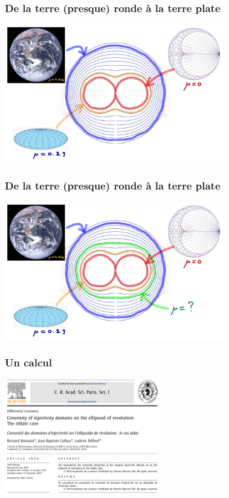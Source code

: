 \documentclass[9pt]{beamer}
\begin{document}
\begin{frame}
\frametitle{\bf De la terre (presque) ronde \`a la terre plate}
 
\centering \includegraphics[height=6.0cm]{oblat3}

\end{frame}

\begin{frame}
\frametitle{\bf De la terre (presque) ronde \`a la terre plate}
 
\centering \includegraphics[height=6.0cm]{oblat4}

\end{frame}

\begin{frame}
\frametitle{\bf Un calcul}
 
\centering \includegraphics[height=5.0cm]{cras1}

\end{frame}
\end{document}
